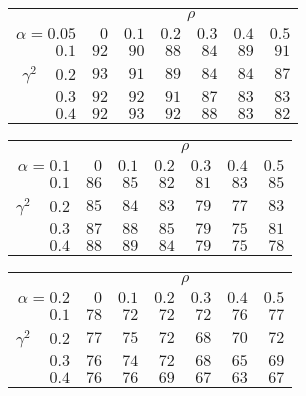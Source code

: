 \begin{tabular}{r|rrrrrr}
\hline\hline
 &\multicolumn{6}{c}{$\rho$} \\ 
 $\alpha = 0.05$ & $0$ & $0.1$ & $0.2$ & $0.3$ & $0.4$ & $0.5$ \\ 
 \hline$0.1$ & $92$ & $90$ & $88$ & $84$ & $89$ & $91$\\ 
$\gamma^2\;\;\;$ $0.2$ & $93$ & $91$ & $89$ & $84$ & $84$ & $87$\\ 
$0.3$ & $92$ & $92$ & $91$ & $87$ & $83$ & $83$\\ 
$0.4$ & $92$ & $93$ & $92$ & $88$ & $83$ & $82$\\ 
 \hline 
 \end{tabular}
 
 \vspace{2em} 
 
\begin{tabular}{r|rrrrrr}
\hline\hline
 &\multicolumn{6}{c}{$\rho$} \\ 
 $\alpha = 0.1$ & $0$ & $0.1$ & $0.2$ & $0.3$ & $0.4$ & $0.5$ \\ 
 \hline$0.1$ & $86$ & $85$ & $82$ & $81$ & $83$ & $85$\\ 
$\gamma^2\;\;\;$ $0.2$ & $85$ & $84$ & $83$ & $79$ & $77$ & $83$\\ 
$0.3$ & $87$ & $88$ & $85$ & $79$ & $75$ & $81$\\ 
$0.4$ & $88$ & $89$ & $84$ & $79$ & $75$ & $78$\\ 
 \hline 
 \end{tabular}
 
 \vspace{2em} 
 
\begin{tabular}{r|rrrrrr}
\hline\hline
 &\multicolumn{6}{c}{$\rho$} \\ 
 $\alpha = 0.2$ & $0$ & $0.1$ & $0.2$ & $0.3$ & $0.4$ & $0.5$ \\ 
 \hline$0.1$ & $78$ & $72$ & $72$ & $72$ & $76$ & $77$\\ 
$\gamma^2\;\;\;$ $0.2$ & $77$ & $75$ & $72$ & $68$ & $70$ & $72$\\ 
$0.3$ & $76$ & $74$ & $72$ & $68$ & $65$ & $69$\\ 
$0.4$ & $76$ & $76$ & $69$ & $67$ & $63$ & $67$\\ 
 \hline 
 \end{tabular}